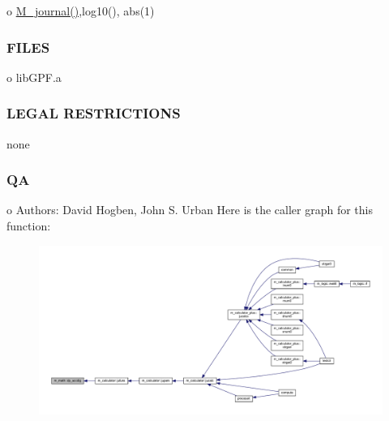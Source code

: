 o \hyperlink{M__journal_83_8txt_aba3a4e3e5bac44e7e807c3472bb2af91}{M\+\_\+journal()},log10(), abs(1)

\subsubsection*{F\+I\+L\+ES}

o lib\+G\+P\+F.\+a \subsubsection*{L\+E\+G\+AL R\+E\+S\+T\+R\+I\+C\+T\+I\+O\+NS}

none \subsubsection*{QA}

o Authors\+: David Hogben, John S. Urban Here is the caller graph for this function\+:
\nopagebreak
\begin{figure}[H]
\begin{center}
\leavevmode
\includegraphics[width=350pt]{namespacem__math_a08a8a6121a85932548baee1a0e3af4d9_icgraph}
\end{center}
\end{figure}
\mbox{\label{namespacem__math_aec13601dba0398f78ad7b25d964f40a6}} 
